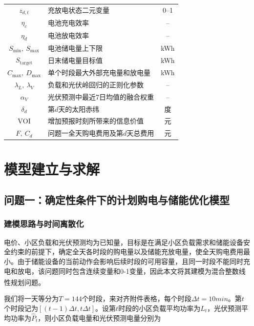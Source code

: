 \documentclass[UTF8]{ctexart}
\let\oldcite\cite
\renewcommand{\cite}[1]{\textsuperscript{\oldcite{#1}}}
\begin{document}
\begin{longtable}{clc}
        $z_{d,t}$ & 充放电状态二元变量 & 0--1 \\
        $\eta_c$ & 电池充电效率 & -- \\
        $\eta_d$ & 电池放电效率 & -- \\
        $S_{\min},\ S_{\max}$ & 电池储电量上下限 & kWh \\
        $S_{\mathrm{target}}$ & 日末储电量目标值 & kWh \\
        $C_{\max},\ D_{\max}$ & 单个时段最大外部充电量和放电量 & kWh \\
        $\lambda_L,\ \lambda_V$ & 负载和光伏岭回归的正则化参数 & -- \\
        $\alpha_V$ & 光伏预测中最近7日均值的融合权重 & -- \\
        $\delta_d$ & 第$d$天的太阳赤纬 & 度 \\
        $\mathrm{VOI}$ & 增加预报时刻所带来的信息价值 & 元 \\
        $F,\ C_d$ & 问题一全天购电费用及第$d$天总费用 & 元 \\
    \end{longtable}
    
    \endgroup
    
    \clearpage
    
    \section{模型建立与求解}
    
    \subsection{问题一：确定性条件下的计划购电与储能优化模型}
    
    \subsubsection{建模思路与时间离散化}
    
    电价、小区负载和光伏预测均为已知量，目标是在满足小区负载需求和储能设备安全约束的前提下，确定全天各时段的购电量以及储能充放电量，使全天购电费用最小。由于储能设备的当前动作会影响后续时段的可用容量，且同一时段不能同时充电和放电，该问题同时包含连续变量和0-1变量，因此本文将其建模为混合整数线性规划问题\cite{1664974}。\par
    
    我们将一天等分为$T=144$个时段，来对齐附件表格，每个时段{$\Delta t = 10 min$}。第$t$个时段记为$[(t-1)\Delta t,t\Delta t]$。设第$t$时段的小区负载平均功率为$L_t$，光伏预测平均功率为$\widehat P_t$，则小区负载电量和光伏预测电量分别为
    
\end{document}
